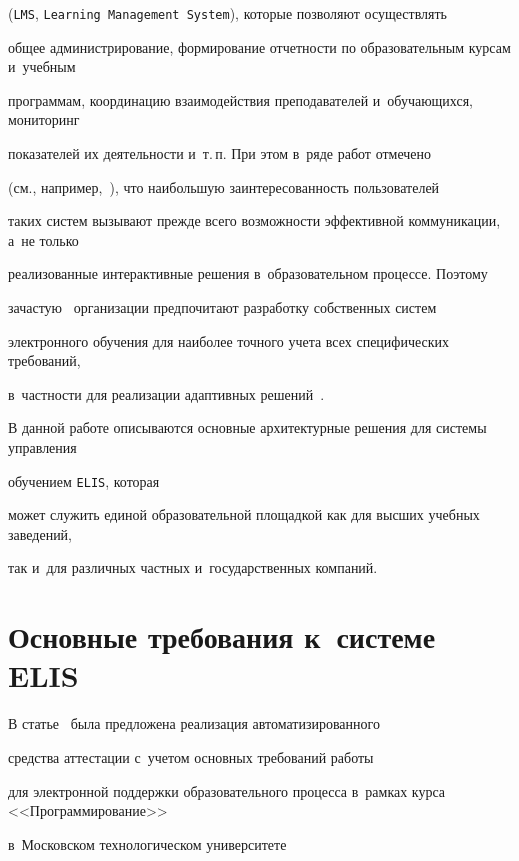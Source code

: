 (\verb"LMS", \verb"Learning Management System"), которые позволяют осуществлять 


общее администрирование, формирование отчетности по  образовательным курсам и~учебным 


программам, координацию взаимодействия преподавателей и~обучающихся, мониторинг 


показателей их деятельности и~т.\,п. При этом в~ряде работ отмечено 


(см., например,~\cite{Lonn2009}), что наибольшую заинтересованность пользователей 


таких сис\-тем вызывают прежде всего возможности эффективной коммуникации, а~не только 


реализованные интерактивные решения в~образовательном процессе. Поэтому 


зачастую~\cite{Paulsen2003} организации предпочитают разработку собственных сис\-тем 


электронного обучения для наиболее точного учета всех специфических требований, 


в~част\-ности для реализации адаптивных решений~\cite{Shute2003}.





В данной работе описываются основные архитектурные решения для сис\-те\-мы управ\-ле\-ния


 обучением \verb"ELIS", которая 


 может служить единой образовательной площадкой как для высших учебных заведений, 


 так и~для различных частных и~государственных компаний.





\section{Основные требования к~системе ELIS}





В статье~\cite{Gorshenin2016b} была предложена реализация автоматизированного 


средства аттестации с~учетом основных требований  работы~\cite{Gorshenin2014} 


для электронной поддержки образовательного процесса в~рамках курса <<Программирование>> 


в~Московском технологическом университете 



